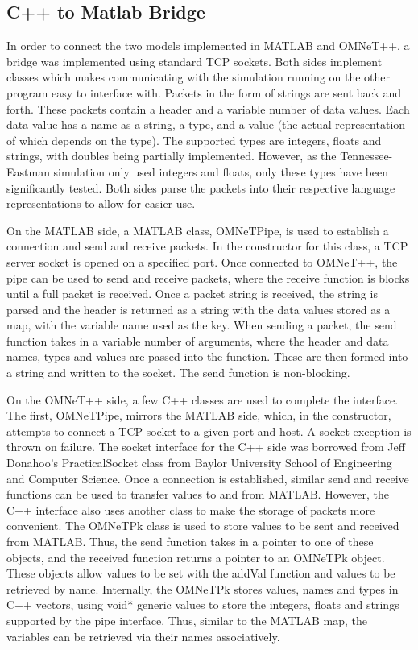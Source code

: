 \subsection{C++ to Matlab Bridge}

In order to connect the two models implemented in MATLAB and OMNeT++, a bridge was implemented using standard TCP sockets. Both sides implement classes which makes communicating with the simulation running on the other program easy to interface with. Packets in the form of strings are sent back and forth. These packets contain a header and a variable number of data values. Each data value has a name as a string, a type, and a value (the actual representation of which depends on the type). The supported types are integers, floats and strings, with doubles being partially implemented. However, as the Tennessee-Eastman simulation only used integers and floats, only these types have been significantly tested. Both sides parse the packets into their respective language representations to allow for easier use.

On the MATLAB side, a MATLAB class, OMNeTPipe, is used to establish a connection and send and receive packets. In the constructor for this class, a TCP server socket is opened on a specified port. Once connected to OMNeT++, the pipe can be used to send and receive packets, where the receive function is blocks until a full packet is received. Once a packet string is received, the string is parsed and the header is returned as a string with the data values stored as a map, with the variable name used as the key. When sending a packet, the send function takes in a variable number of arguments, where the header and data names, types and values are passed into the function. These are then formed into a string and written to the socket. The send function is non-blocking.

On the OMNeT++ side, a few C++ classes are used to complete the interface. The first, OMNeTPipe, mirrors the MATLAB side, which, in the constructor, attempts to connect a TCP socket to a given port and host. A socket exception is thrown on failure. The socket interface for the C++ side was borrowed from Jeff Donahoo's PracticalSocket class from Baylor University School of Engineering and Computer Science. Once a connection is established, similar send and receive functions can be used to transfer values to and from MATLAB. However, the C++ interface also uses another class to make the storage of packets more convenient. The OMNeTPk class is used to store values to be sent and received from MATLAB. Thus, the send function takes in a pointer to one of these objects, and the received function returns a pointer to an OMNeTPk object. These objects allow values to be set with the addVal function and values to be retrieved by name. Internally, the OMNeTPk stores values, names and types in C++ vectors, using void* generic values to store the integers, floats and strings supported by the pipe interface. Thus, similar to the MATLAB map, the variables can be retrieved via their names associatively.

